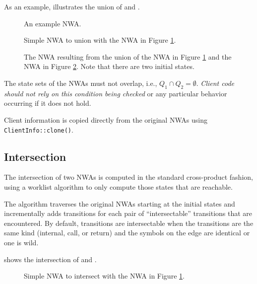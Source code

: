 As an example,  illustrates the union of  and
.


\begin{figure}[htb]
  \centering
  \caption{An example NWA.}
  \label{Fi:Example1}
\end{figure}


\begin{figure}[htbp]
  \centering
  \caption{Simple NWA to union with the NWA in Figure \ref{Fi:Example1}.}
  \label{Fi:Union1}
\end{figure}

\begin{figure}[htbp]
  \centering
  \caption{The NWA resulting from the union of the NWA in Figure
    \ref{Fi:Example1} and the NWA in Figure \ref{Fi:Union1}. Note that there
    are two initial states.}
  \label{Fi:Union2}
\end{figure}

The state sets of the NWAs must not overlap,
i.e., $Q_1 \cap Q_2 = \emptyset$. \textsl{Client code should not rely on
  this condition being checked} or any particular behavior occurring if it
does not hold.

Client information is copied directly from the original NWAs using
\texttt{ClientInfo::clone()}.


\subsection{Intersection}
\label{Se:Intersection}

The intersection of two NWAs is computed in the standard cross-product
fashion, using a worklist algorithm to only compute those states that
are reachable.

The algorithm traverses the original NWAs starting at
the initial states and incrementally adds transitions for each pair of
``intersectable'' transitions that are encountered. By default, transitions
are intersectable when the transitions are the same kind (internal, call,
or return) and the symbols on the edge are identical or one is wild.

 shows the intersection of  and
.
 
\begin{figure}[htbp]
  \centering
  \caption{Simple NWA to intersect with the NWA in Figure \ref{Fi:Example1}.}
  \label{Fi:Intersect1}
\end{figure}

